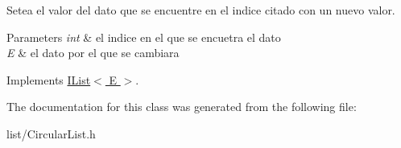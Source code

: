 Setea el valor del dato que se encuentre en el indice citado con un nuevo valor. 


\begin{DoxyParams}{Parameters}
{\em int} & el indice en el que se encuetra el dato \\
\hline
{\em E} & el dato por el que se cambiara \\
\hline
\end{DoxyParams}


Implements \hyperlink{class_i_list_a119ed658d2804aec0b9fef9325c03073}{I\-List$<$ E $>$}.



The documentation for this class was generated from the following file\-:\begin{DoxyCompactItemize}
\item 
list/Circular\-List.\-h\end{DoxyCompactItemize}
